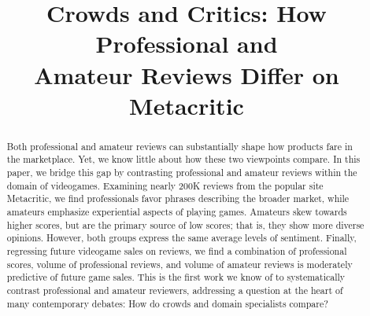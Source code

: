 \documentclass{sig-alternate}
\begin{document}
\skip{}\bigskipamount     %
\renewcommand*{\footnoterule}{
  \kern-3pt
  \hrule width 2in
  \kern 2.6pt
  \vspace{\smallskipamount}       %
}
\renewcommand\arraystretch{1.3}

\makeatletter
\def\url@leostyle{%
  \@ifundefined{selectfont}{\def\UrlFont{\sf}}{\def\UrlFont{\small\ttfamily}}}
\makeatother



\markright{\today}


\title{Crowds and Critics: How Professional and \\ [0.5ex]Amateur Reviews
Differ on Metacritic}
\author{
}
\maketitle

\begin{abstract}
Both professional and amateur reviews can substantially shape how products fare in the marketplace.
Yet, we know little about how these two viewpoints compare. 
In this paper, we bridge this gap by contrasting professional and amateur reviews within the domain of videogames. 
Examining nearly 200K reviews from the popular site Metacritic, we find professionals favor phrases describing the broader market, while amateurs emphasize experiential aspects of playing games. 
Amateurs skew towards higher scores, but are the primary source of low scores; that is, they show more diverse opinions.
\hspace{1pt} However, both groups express the same average levels of sentiment.
Finally, regressing future videogame sales on reviews, we find a combination of professional scores, volume of professional reviews, and volume of amateur reviews is moderately predictive of future game sales. 
This is the first work we know of to systematically contrast professional and amateur reviewers, addressing a question at the heart of many contemporary debates: How do crowds and domain specialists compare?
\end{abstract}
\end{document}
